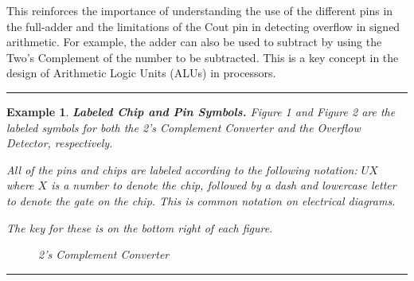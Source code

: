 \documentclass[12pt]{article}
\newtheorem{example}{Example}
\newenvironment{examp}
{\vspace{0.5cm}
\hrule
\begin{example}}
{\hrule
\vspace{0.5cm}
\end{example}}
\begin{document}
This reinforces the importance of understanding the use of the different pins in the full-adder and the limitations of the Cout pin in detecting overflow in signed arithmetic. For example, the adder can also be used to subtract by using the Two's Complement of the number to be subtracted. This is a key concept in the design of Arithmetic Logic Units (ALUs) in processors.
\begin{examp}
	\textbf{Labeled Chip and Pin Symbols.}\newline
	Figure 1 and Figure 2 are the labeled symbols for both the 2’s Complement Converter and the Overflow Detector, respectively.

	All of the pins and chips are labeled according to the following notation: \(UX\) where \(X\) is a number to denote the chip, followed by a dash and lowercase letter to denote the gate on the chip. This is common notation on electrical diagrams.

	The key for these is on the bottom right of each figure.
	\begin{figure}[H]
		\caption{2's Complement Converter}
	\end{figure}


\end{examp}
\end{document}

